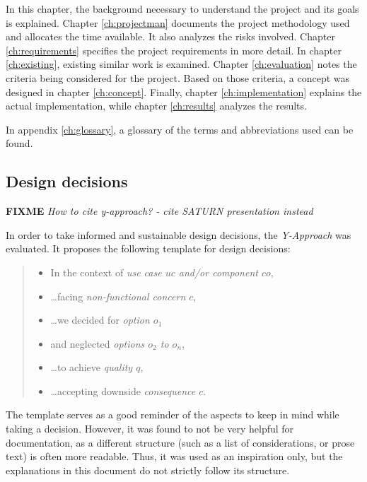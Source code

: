 \documentclass[a4paper,parskip=full]{scrreprt}
\newcommand{\fixme}[1]{\textbf{FIXME} \emph{#1}}
\begin{document}
In this chapter, the background necessary to understand the
project and its goals is explained. Chapter \ref{ch:projectman} documents the
project methodology used and allocates the time available.
It also analyzes the risks involved. Chapter \ref{ch:requirements} specifies the
project requirements in more detail. In chapter \ref{ch:existing}, existing
similar work is examined. Chapter \ref{ch:evaluation} notes the criteria being
considered for the project. Based on those criteria, a concept was designed in chapter
\ref{ch:concept}. Finally, chapter \ref{ch:implementation} explains the actual
implementation, while chapter \ref{ch:results} analyzes the results.

In appendix \ref{ch:glossary}, a glossary of the terms and abbreviations used
can be found.

\subsection{Design decisions}
\fixme{How to cite y-approach? - cite SATURN presentation instead}

In order to take informed and sustainable design decisions, the
\emph{Y-Approach} \autocite{yapproach} was evaluated. It proposes the following
template for design decisions:

\begin{quote}
  \begin{itemize}
    \item In the context of \emph{use case $uc$ and/or component $co$},
    \item \ldots facing \emph{non-functional concern $c$},
    \item \ldots we decided for \emph{option $o_1$}
    \item and neglected \emph{options $o_2$ to $o_n$},
    \item \ldots to achieve \emph{quality $q$},
    \item \ldots accepting downside \emph{consequence $c$}.
  \end{itemize}
\end{quote}

The template serves as a good reminder of the aspects to keep in mind
while taking a decision. However, it was found to not be very helpful for
documentation, as a different structure (such as a list of considerations, or
prose text) is often more readable. Thus, it was used as an inspiration only,
but the explanations in this document do not strictly follow its structure.
\end{document}
